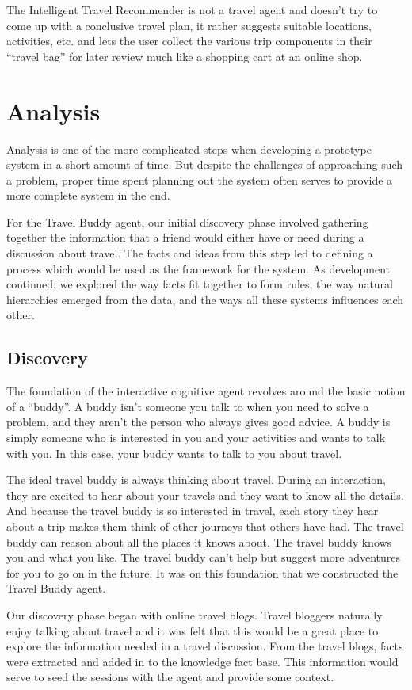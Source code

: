 \documentclass[11pt]{article} %
\begin{document}
The Intelligent Travel Recommender is not a travel agent and doesn't try to come up
with a conclusive travel plan, it rather suggests suitable
locations, activities, etc. and lets the user collect the
various trip components in their ``travel bag'' for later
review much like a shopping cart at an online shop. 

\section{Analysis}
Analysis is one of the more complicated steps when developing a prototype system in a short amount of time. But despite the challenges of approaching such a problem, proper time spent planning out the system often serves to provide a more complete system in the end.

For the Travel Buddy agent, our initial discovery phase involved gathering together the information that a friend would either have or need during a discussion about travel. The facts and ideas from this step led to defining a process which would be used as the framework for the system. As development continued, we explored the way facts fit together to form rules, the way natural hierarchies emerged from the data, and the ways all these systems influences each other.

\subsection{Discovery}
The foundation of the interactive cognitive agent revolves around the basic notion of a ``buddy''. A buddy isn't someone you talk to when you need to solve a problem, and they aren't the person who always gives good advice. A buddy is simply someone who is interested in you and your activities and wants to talk with you. In this case, your buddy wants to talk to you about travel.

The ideal travel buddy is always thinking about travel. During an interaction, they are excited to hear about your travels and they want to know all the details. And because the travel buddy is so interested in travel, each story they hear about a trip makes them think of other journeys that others have had. The travel buddy can reason about all the places it knows about. The travel buddy knows you and what you like. The travel buddy can't help but suggest more adventures for you to go on in the future. It was on this foundation that we constructed the Travel Buddy agent.

Our discovery phase began with online travel blogs\cite{kate15}\cite{amanda15}. Travel bloggers naturally enjoy talking about travel and it was felt that this would be a great place to explore the information needed in a travel discussion. From the travel blogs, facts were extracted and added in to the knowledge fact base. This information would serve to seed the sessions with the agent and provide some context.
\end{document}
